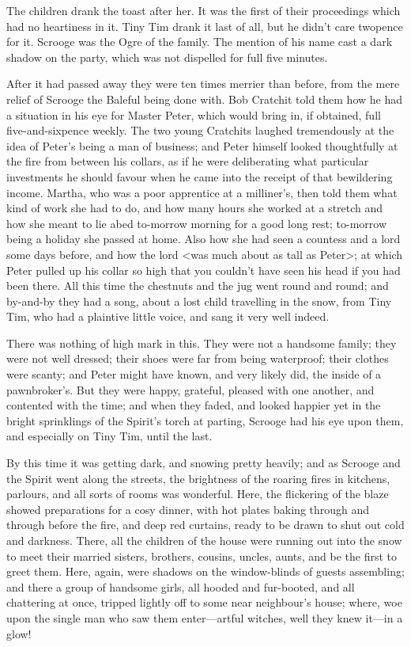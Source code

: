 The children drank the toast after her. It was the first of their proceedings which had no heartiness in it. Tiny Tim drank it last of all, but he didn't care twopence for it. Scrooge was the Ogre of the family. The mention of his name cast a dark shadow on the party, which was not dispelled for full five minutes.

After it had passed away they were ten times merrier than before, from the mere relief of Scrooge the Baleful being done with. Bob Cratchit told them how he had a situation in his eye for Master Peter, which would bring in, if obtained, full five-and-sixpence weekly. The two young Cratchits laughed tremendously at the idea of Peter's being a man of business; and Peter himself looked thoughtfully at the fire from between his collars, as if he were deliberating what particular investments he should favour when he came into the receipt of that bewildering income. Martha, who was a poor apprentice at a milliner's, then told them what kind of work she had to do, and how many hours she worked at a stretch and how she meant to lie abed to-morrow morning for a good long rest; to-morrow being a holiday she passed at home. Also how she had seen a countess and a lord some days before, and how the lord <was much about as tall as Peter>; at which Peter pulled up his collar so high that you couldn't have seen his head if you had been there. All this time the chestnuts and the jug went round and round; and by-and-by they had a song, about a lost child travelling in the snow, from Tiny Tim, who had a plaintive little voice, and sang it very well indeed.

There was nothing of high mark in this. They were not a handsome family; they were not well dressed; their shoes were far from being waterproof; their clothes were scanty; and Peter might have known, and very likely did, the inside of a pawnbroker's. But they were happy, grateful, pleased with one another, and contented with the time; and when they faded, and looked happier yet in the bright sprinklings of the Spirit's torch at parting, Scrooge had his eye upon them, and especially on Tiny Tim, until the last.

By this time it was getting dark, and snowing pretty heavily; and as Scrooge and the Spirit went along the streets, the brightness of the roaring fires in kitchens, parlours, and all sorts of rooms was wonderful. Here, the flickering of the blaze showed preparations for a cosy dinner, with hot plates baking through and through before the fire, and deep red curtains, ready to be drawn to shut out cold and darkness. There, all the children of the house were running out into the snow to meet their married sisters, brothers, cousins, uncles, aunts, and be the first to greet them. Here, again, were shadows on the window-blinds of guests assembling; and there a group of handsome girls, all hooded and fur-booted, and all chattering at once, tripped lightly off to some near neighbour's house; where, woe upon the single man who saw them enter—artful witches, well they knew it—in a glow!

